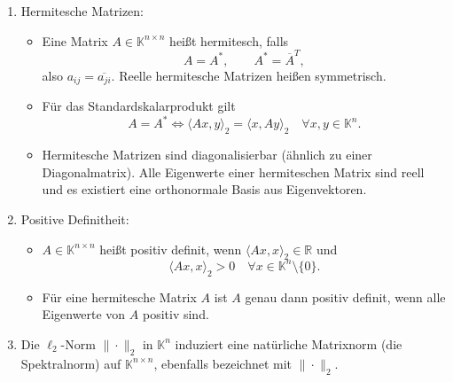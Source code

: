 \begin{bemerkungbox}
\begin{enumerate}
        \item Hermitesche Matrizen:
        \begin{itemize}
            \item Eine Matrix $A\in\mathbb{K}^{n\times n}$ heißt hermitesch, falls
                $$
                A = A^*,\qquad A^*=\overline{A}^T,
                $$
                also $a_{ij}=\overline{a_{ji}}$. Reelle hermitesche Matrizen heißen symmetrisch.
            \item Für das Standardskalarprodukt gilt
                $$
                A=A^* \iff \langle Ax,y\rangle_2 = \langle x,Ay\rangle_2\quad\forall x,y\in\mathbb{K}^n.
                $$
            \item Hermitesche Matrizen sind diagonalisierbar (ähnlich zu einer Diagonalmatrix). Alle Eigenwerte einer hermiteschen Matrix sind reell und es existiert eine orthonormale Basis aus Eigenvektoren.
        \end{itemize}

        \item Positive Definitheit:
        \begin{itemize}
            \item $A\in\mathbb{K}^{n\times n}$ heißt positiv definit, wenn $\langle Ax,x\rangle_2\in\mathbb{R}$ und
                $$
                \langle Ax,x\rangle_2 > 0\quad\forall x\in\mathbb{K}^n\setminus\{0\}.
                $$
            \item Für eine hermitesche Matrix $A$ ist $A$ genau dann positiv definit, wenn alle Eigenwerte von $A$ positiv sind.
        \end{itemize}

        \item Die $\ell_2$-Norm $\|\cdot\|_2$ in $\mathbb{K}^n$ induziert eine natürliche Matrixnorm (die Spektralnorm) auf $\mathbb{K}^{n\times n}$, ebenfalls bezeichnet mit $\|\cdot\|_2$.
    \end{enumerate}
\end{bemerkungbox}